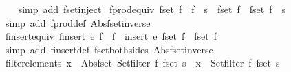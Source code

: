 \begin{isabellebody}
%
\isadelimproof
\ \ %
\endisadelimproof
%
\isatagproof
{}\isamarkupfalse%
\ {\isacharparenleft}simp\ add{\isacharcolon}\ fset{\isacharunderscore}inject{\isacharparenright}%
\endisatagproof
{\isafoldproof}%
%
\isadelimproof
\isanewline
%
\endisadelimproof
\isanewline
{}\isamarkupfalse%
\ fprod{\isacharunderscore}equiv{\isacharcolon}\ {\isachardoublequoteopen}{\isacharparenleft}fset\ {\isacharparenleft}f\ {\isacharbar}{\isasymtimes}{\isacharbar}\ f{\isacharprime}{\isacharparenright}\ {\isacharequal}\ s{\isacharparenright}\ {\isacharequal}\ {\isacharparenleft}{\isacharparenleft}{\isacharparenleft}fset\ f{\isacharparenright}\ {\isasymtimes}\ {\isacharparenleft}fset\ f{\isacharprime}{\isacharparenright}{\isacharparenright}\ {\isacharequal}\ s{\isacharparenright}{\isachardoublequoteclose}\isanewline
%
\isadelimproof
\ \ %
\endisadelimproof
%
\isatagproof
{}\isamarkupfalse%
\ {\isacharparenleft}simp\ add{\isacharcolon}\ fprod{\isacharunderscore}def\ Abs{\isacharunderscore}fset{\isacharunderscore}inverse{\isacharparenright}%
\endisatagproof
{\isafoldproof}%
%
\isadelimproof
\isanewline
%
\endisadelimproof
\isanewline
{}\isamarkupfalse%
\ finsert{\isacharunderscore}equiv{\isacharcolon}\ {\isachardoublequoteopen}{\isacharparenleft}finsert\ e\ f\ {\isacharequal}\ f{\isacharprime}{\isacharparenright}\ {\isacharequal}\ {\isacharparenleft}insert\ e\ {\isacharparenleft}fset\ f{\isacharparenright}\ {\isacharequal}\ {\isacharparenleft}fset\ f{\isacharprime}{\isacharparenright}{\isacharparenright}{\isachardoublequoteclose}\isanewline
%
\isadelimproof
\ \ %
\endisadelimproof
%
\isatagproof
{}\isamarkupfalse%
\ {\isacharparenleft}simp\ add{\isacharcolon}\ finsert{\isacharunderscore}def\ fset{\isacharunderscore}both{\isacharunderscore}sides\ Abs{\isacharunderscore}fset{\isacharunderscore}inverse{\isacharparenright}%
\endisatagproof
{\isafoldproof}%
%
\isadelimproof
\isanewline
%
\endisadelimproof
\isanewline
{}\isamarkupfalse%
\ filter{\isacharunderscore}elements{\isacharcolon}\ {\isachardoublequoteopen}x\ {\isacharbar}{\isasymin}{\isacharbar}\ Abs{\isacharunderscore}fset\ {\isacharparenleft}Set{\isachardot}filter\ f\ {\isacharparenleft}fset\ s{\isacharparenright}{\isacharparenright}\ {\isacharequal}\ {\isacharparenleft}x\ {\isasymin}\ {\isacharparenleft}Set{\isachardot}filter\ f\ {\isacharparenleft}fset\ s{\isacharparenright}{\isacharparenright}{\isacharparenright}{\isachardoublequoteclose}\isanewline
%
\isadelimproof
\ \ %
\endisadelimproof
%
\isatagproof
{}\isamarkupfalse%

\end{isabellebody}

